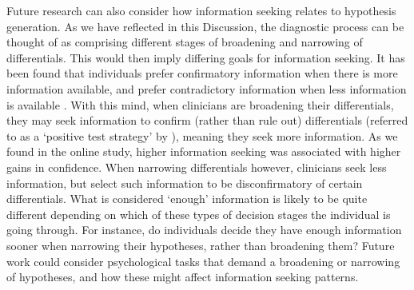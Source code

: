 \documentclass[a4paper, nobind]{templates/ociamthesis}
\begin{document}
Future research can also consider how information seeking relates to hypothesis generation. As we have reflected in this Discussion, the diagnostic process can be thought of as comprising different stages of broadening and narrowing of differentials. This would then imply differing goals for information seeking. It has been found that individuals prefer confirmatory information when there is more information available, and prefer contradictory information when less information is available \autocite{fischer_selective_2008}. With this mind, when clinicians are broadening their differentials, they may seek information to confirm (rather than rule out) differentials (referred to as a `positive test strategy' by \textcite{klayman_confirmation_1987}), meaning they seek more information. As we found in the online study, higher information seeking was associated with higher gains in confidence. When narrowing differentials however, clinicians seek less information, but select such information to be disconfirmatory of certain differentials. What is considered `enough' information is likely to be quite different depending on which of these types of decision stages the individual is going through. For instance, do individuals decide they have enough information sooner when narrowing their hypotheses, rather than broadening them? Future work could consider psychological tasks that demand a broadening or narrowing of hypotheses, and how these might affect information seeking patterns.
\end{document}
